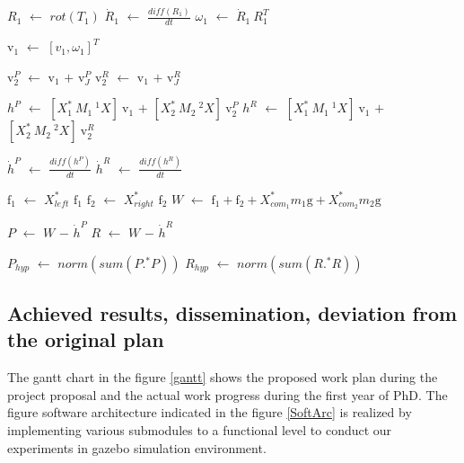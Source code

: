 \documentclass[12pt,a4paper]{report}
\begin{document}
\begin{algorithm}[H]
\begin{algorithmic}[1]
             \STATE $R_1$ $\leftarrow$ $rot(T_1)$
             \STATE $\dot{R}_1$ $\leftarrow$ $\frac{diff(R_1)}{dt}$
             \STATE $\omega_{1}$ $\leftarrow$ $\dot{R}_1 \ R_1^T$
             
             \STATE $\mathrm{v}_1$ $\leftarrow$ $[v_{1},\omega_{1}]^T$
               
             \STATE $\mathrm{v}^P_2$ $\leftarrow$ $\mathrm{v}_1$ $+$ $\mathrm{v}_J^P$
             \STATE $\mathrm{v}^R_2$ $\leftarrow$ $\mathrm{v}_1$ $+$ $\mathrm{v}_J^R$
        
        
             \STATE $h^P$ $\leftarrow$ $[{X}_1^* \ M_1 \ ^1{X}] \ \mathrm{v}_1$ $+$ $[{X}_2^* \ M_2 \ ^2{X}] \ \mathrm{v}_2^P$
             \STATE $h^R$ $\leftarrow$ $[{X}_1^* \ M_1 \ ^1{X}] \ \mathrm{v}_1$ $+$ $[{X}_2^* \ M_2 \ ^2X] \ \mathrm{v}_2^R$
             
             \STATE $\dot{h}^P$ $\leftarrow$ $\frac{diff(h^P)}{dt}$
             \STATE $\dot{h}^R$ $\leftarrow$ $\frac{diff(h^R)}{dt}$
             
             \STATE $\text{f}_1$ $\leftarrow$ $X_{left}^*$ $\text{f}_1$
             \STATE $\text{f}_2$ $\leftarrow$ $X_{right}^*$ $\text{f}_2$
             \STATE $W$ $\leftarrow$ $\text{f}_1 + \text{f}_2 + {X_{{com}_1}^*} m_1 \text{g} + {X_{{com}_2}^*} m_2 \text{g} $
             
             \newpage
             
             \STATE $P$ $\leftarrow$ $W$ $-$ $\dot{h}^P$
             \STATE $R$ $\leftarrow$ $W$ $-$ $\dot{h}^R$
        
           
           
        \ENDFOR    
        \STATE $P_{hyp}$ $\leftarrow$ $norm(sum(P.^*P))$ 
        \STATE $R_{hyp}$ $\leftarrow$ $norm(sum(R.^*R))$      
    \end{algorithmic}
\end{algorithm}




\subsection{Achieved results, dissemination, deviation from the original plan}
The gantt chart in the figure \ref{gantt} shows the proposed work plan during the project proposal and the actual work progress during the first year of PhD. The figure software architecture indicated in the figure \ref{SoftArc} is realized by implementing various submodules to a functional level to conduct our experiments in gazebo simulation environment.
\end{document}
